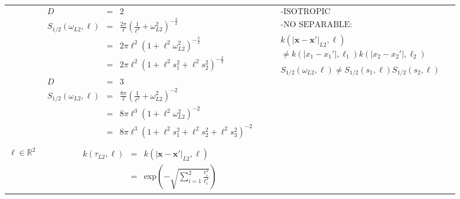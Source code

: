 \documentclass[onecolumn,a4paper,11pt]{article}
\begin{document}
\begin{landscape}
\begin{table}[H]
\begin{center}
\begin{tabular}{|c|c|c|c|}
       & \multicolumn{1}{|p{8.2cm}|}{\small
         \begin{eqnarray*}
		D &=& 2\\
		S_{1/2}(\omega_{L2},\ell) &=& \frac{2\pi}{\ell}\left(\frac{1}{\ell^2}+\omega_{L2}^2 \right)^{-\frac{3}{2}} \\
		&=& 2\pi\ell^2\left(1+\ell^2\omega_{L2}^2\right)^{-\frac{3}{2}} \\
		&=& 2\pi\ell^2\left(1+\ell^2s_{1}^2+\ell^2s_{2}^2\right)^{-\frac{3}{2}} \\
		\\
		D &=& 3\\
		S_{1/2}(\omega_{L2},\ell) &=& \frac{8\pi}{\ell}\left(\frac{1}{\ell^2}+\omega_{L2}^2 \right)^{-2} \\
		&=& 8\pi\ell^3\left(1+\ell^2\omega_{L2}^2\right)^{-2} \\
		&=& 8\pi\ell^3\left(1+\ell^2s_{1}^2+\ell^2s_{2}^2+\ell^2s_{3}^2\right)^{-2} 
         \end{eqnarray*}
       }
       
       & \multicolumn{1}{|p{6.2cm}|}{\small
         \begin{eqnarray*}
        &&\text{-ISOTROPIC}\\
        \\
		&&\text{-NO SEPARABLE:} \\
		\\
		&&k(|\bm{x}-\bm{x}'|_{L2},\bm{\ell})\\
		 &&\neq k(|x_1-x_1'|,\ell_1)k(|x_2-x_2'|,\ell_2)\\
		 \\
		&&S_{1/2}(\omega_{L2},\ell)\neq S_{1/2}(s_1,\ell)S_{1/2}(s_2,\ell)
         \end{eqnarray*}
       }\\
       \vspace{-10mm}\\
        \cline{1-3}
         
       \multicolumn{1}{|p{1.5cm}|}{
       \vspace{1mm}
       $\bm{\ell} \in \mathbb{R}^2$
       }
       
         & \multicolumn{1}{|p{7.2cm}|}{\small
         \begin{eqnarray*}
		k(\tau_{L2},\bm{\ell}) &=& k(|\bm{x}-\bm{x}'|_{L2},\bm{\ell})\\
		&=& \mathrm{exp}\left(-\sqrt{\sum_{i=1}^{2}\frac{r_i^2}{\ell_i^2}} \right)
         \end{eqnarray*}
       }
       

\end{tabular}
\end{center}
\end{table}
\end{landscape}
\end{document}
